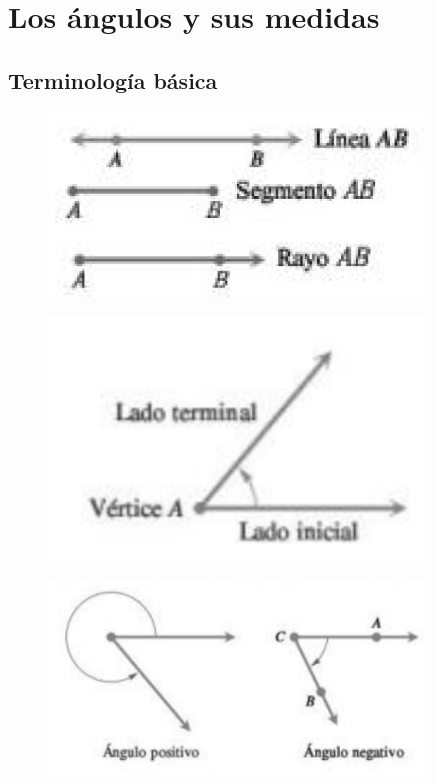 \section{Los ángulos y sus medidas}
\subsection{Terminología básica}
{}
	\begin{figure}[h]
		\centering
		\includegraphics[width=10cm,keepaspectratio=true]{./trig/trig_101-1.png}
		\label{fig:101-1}
	\end{figure}
	

{}
	\begin{figure}[h]
		\centering
		\includegraphics[width=10cm,keepaspectratio=true]{./trig/trig_101-2.png}
		\label{fig:101-2}
	\end{figure}
	

{}
	\begin{figure}[h]
		\centering
		\includegraphics[width=10cm,keepaspectratio=true]{./trig/trig_101-3.png}
		\label{fig:101-3}
	\end{figure}
	

